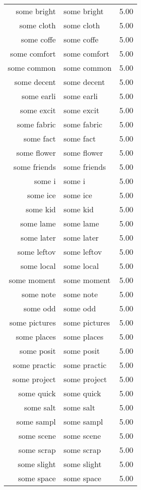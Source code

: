\begin{table}[ht]
\begin{tabular}{rlr}
  some bright & some bright & 5.00 \\ 
  some cloth & some cloth & 5.00 \\ 
  some coffe & some coffe & 5.00 \\ 
  some comfort & some comfort & 5.00 \\ 
  some common & some common & 5.00 \\ 
  some decent & some decent & 5.00 \\ 
  some earli & some earli & 5.00 \\ 
  some excit & some excit & 5.00 \\ 
  some fabric & some fabric & 5.00 \\ 
  some fact & some fact & 5.00 \\ 
  some flower & some flower & 5.00 \\ 
  some friends & some friends & 5.00 \\ 
  some i & some i & 5.00 \\ 
  some ice & some ice & 5.00 \\ 
  some kid & some kid & 5.00 \\ 
  some lame & some lame & 5.00 \\ 
  some later & some later & 5.00 \\ 
  some leftov & some leftov & 5.00 \\ 
  some local & some local & 5.00 \\ 
  some moment & some moment & 5.00 \\ 
  some note & some note & 5.00 \\ 
  some odd & some odd & 5.00 \\ 
  some pictures & some pictures & 5.00 \\ 
  some places & some places & 5.00 \\ 
  some posit & some posit & 5.00 \\ 
  some practic & some practic & 5.00 \\ 
  some project & some project & 5.00 \\ 
  some quick & some quick & 5.00 \\ 
  some salt & some salt & 5.00 \\ 
  some sampl & some sampl & 5.00 \\ 
  some scene & some scene & 5.00 \\ 
  some scrap & some scrap & 5.00 \\ 
  some slight & some slight & 5.00 \\ 
  some space & some space & 5.00 \\ 

\end{tabular}
\end{table}
